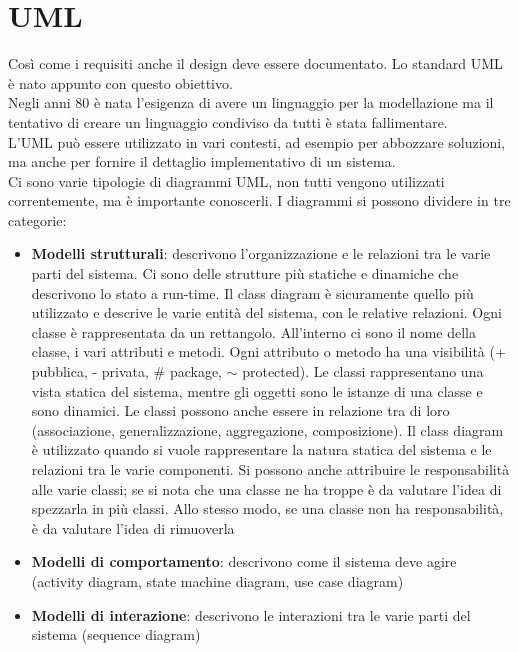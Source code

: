 \section{UML}
\label{sec:05_uml}
Così come i requisiti anche il design deve essere documentato.
Lo standard \acrfull{UML} è nato appunto con questo obiettivo.\\
Negli anni 80 è nata l'esigenza di avere un linguaggio per la modellazione ma il tentativo di creare un linguaggio condiviso da tutti è stata fallimentare.\\
L'UML può essere utilizzato in vari contesti, ad esempio per abbozzare soluzioni, ma anche per fornire il dettaglio implementativo di un sistema.\\
Ci sono varie tipologie di diagrammi UML, non tutti vengono utilizzati correntemente, ma è importante conoscerli.
I diagrammi si possono dividere in tre categorie:
\begin{itemize}[noitemsep]
    \item \textbf{Modelli strutturali}: descrivono l'organizzazione e le relazioni tra le varie parti del sistema. Ci sono delle strutture più statiche e dinamiche che descrivono lo stato a run-time. Il class diagram è sicuramente quello più utilizzato e descrive le varie entità del sistema, con le relative relazioni. Ogni classe è rappresentata da un rettangolo. All'interno ci sono il nome della classe, i vari attributi e metodi. Ogni attributo o metodo ha una visibilità (+ pubblica, - privata, \# package, $\sim$ protected). Le classi rappresentano una vista statica del sistema, mentre gli oggetti sono le istanze di una classe e sono dinamici. Le classi possono anche essere in relazione tra di loro (associazione, generalizzazione, aggregazione, composizione). Il class diagram è utilizzato quando si vuole rappresentare la natura statica del sistema e le relazioni tra le varie componenti. Si possono anche attribuire le responsabilità alle varie classi; se si nota che una classe ne ha troppe è da valutare l'idea di spezzarla in più classi. Allo stesso modo, se una classe non ha responsabilità, è da valutare l'idea di rimuoverla
    \item \textbf{Modelli di comportamento}: descrivono come il sistema deve agire (activity diagram, state machine diagram, use case diagram)
    \item \textbf{Modelli di interazione}: descrivono le interazioni tra le varie parti del sistema (sequence diagram)
\end{itemize}